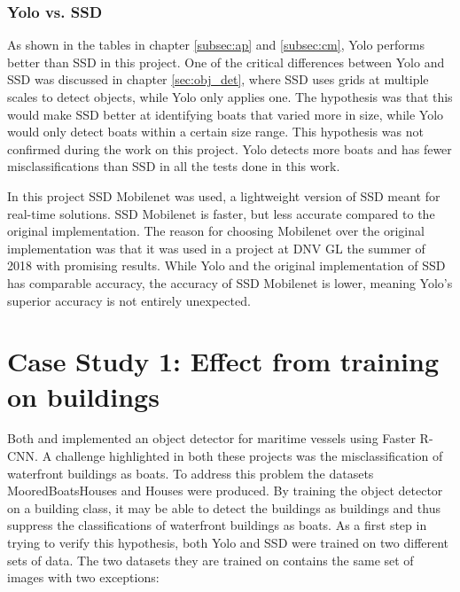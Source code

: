 \subsubsection{Yolo vs. SSD}
As shown in the tables in chapter \ref{subsec:ap} and \ref{subsec:cm}, Yolo performs better than SSD in this project. One of the critical differences between Yolo and SSD was discussed in chapter \ref{sec:obj_det}, where SSD uses grids at multiple scales to detect objects, while Yolo only applies one. The hypothesis was that this would make SSD better at identifying boats that varied more in size, while Yolo would only detect boats within a certain size range. This hypothesis was not confirmed during the work on this project. Yolo detects more boats and has fewer misclassifications than SSD in all the tests done in this work.

\vspace{3mm}

\noindent
In this project SSD Mobilenet was used, a lightweight version of SSD meant for real-time solutions. SSD Mobilenet is faster, but less accurate compared to the original implementation. The reason for choosing Mobilenet over the original implementation was that it was used in a project at DNV GL the summer of 2018 with promising results. While Yolo and the original implementation of SSD has comparable accuracy, the accuracy of SSD Mobilenet is lower, meaning Yolo's superior accuracy is not entirely unexpected. 








\newpage

\section{Case Study 1: Effect from training on buildings}
\label{case_study:eff_build}

Both \citep{Tangstad2017} and \citep{Kamsvag2018} implemented an object detector for maritime vessels using Faster R-CNN. A challenge highlighted in both these projects was the misclassification of waterfront buildings as boats. To address this problem the datasets MooredBoatsHouses and Houses were produced. By training the object detector on a building class, it may be able to detect the buildings as buildings and thus suppress the classifications of waterfront buildings as boats. As a first step in trying to verify this hypothesis, both Yolo and SSD were trained on two different sets of data. The two datasets they are trained on contains the same set of images with two exceptions:

